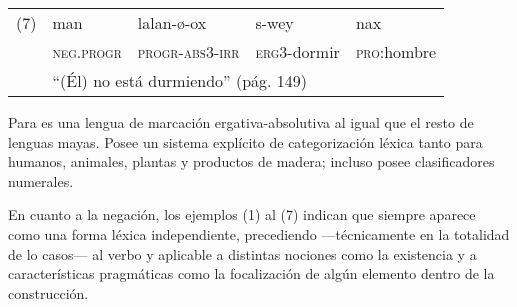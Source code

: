 {      %
      \noindent \begin{tabular}{lllll}
            (7) & man                                                     & lalan-ø-ox              & s-wey              & nax                 \\
                & \textsc{neg.progr}                                      & \textsc{progr-abs3-irr} & \textsc{erg3}-dormir & \textsc{pro}:hombre \\
                & \multicolumn{4}{l}{“(Él) no está durmiendo” (pág. 149)}                                                                      \\
      \end{tabular} \vspace{0.3cm}
}

Para \textcolor{MidnightBlue}{
\citet{acateco}} es una lengua de marcación ergativa-absolutiva al igual que el resto de lenguas mayas. Posee un sistema explícito de categorización léxica tanto para humanos, animales, plantas y productos de madera; incluso posee clasificadores numerales.

En cuanto a la negación, los ejemplos (1) al (7) indican que siempre aparece como una forma léxica independiente, precediendo —técnicamente en la totalidad de lo casos— al verbo y aplicable a distintas nociones como la existencia y a características pragmáticas como la focalización de algún elemento dentro de la construcción.
